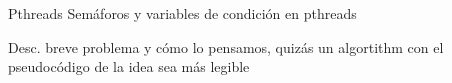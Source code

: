 Pthreads
Semáforos y variables de condición en pthreads

Desc. breve problema y cómo lo pensamos, quizás un algortithm con el pseudocódigo de la idea sea más legible